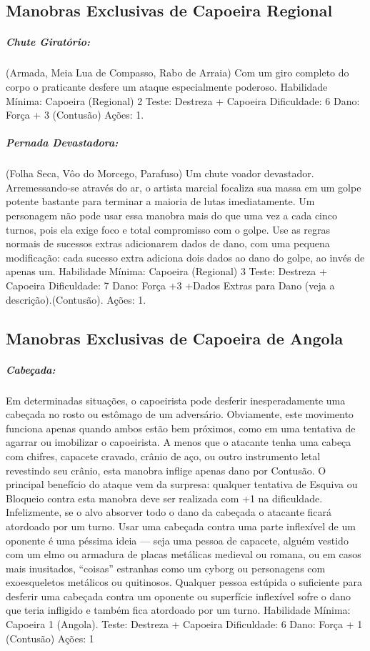 \subsection{Manobras Exclusivas de Capoeira Regional}

\subparagraph{\bf Chute Giratório:}
(Armada, Meia Lua de Compasso, Rabo de Arraia) Com um giro completo do corpo o praticante desfere um ataque especialmente poderoso. 
	Habilidade Mínima: Capoeira (Regional) 2
    Teste: Destreza + Capoeira
    Dificuldade: 6
    Dano: Força + 3 (Contusão)
    Ações: 1.

\subparagraph{\bf Pernada Devastadora:}
(Folha Seca, Vôo do Morcego, Parafuso) Um chute voador devastador. Arremessando-se através do ar, o artista marcial focaliza sua massa em um golpe potente bastante para terminar a maioria de lutas imediatamente. Um personagem não pode usar essa manobra mais do que uma vez a cada cinco turnos, pois ela exige foco e total compromisso com o golpe. Use as regras normais de sucessos extras adicionarem dados de dano, com uma pequena modificação: cada sucesso extra adiciona dois dados ao dano do golpe, ao invés de apenas um.
	Habilidade Mínima: Capoeira (Regional) 3
    Teste: Destreza + Capoeira
    Dificuldade: 7
    Dano: Força +3 +Dados Extras para Dano (veja a descrição).(Contusão).
    Ações: 1.

\subsection{Manobras Exclusivas de Capoeira de Angola}

\subparagraph{\bf Cabeçada:}
Em determinadas situações, o capoeirista pode desferir inesperadamente uma cabeçada no rosto ou estômago de um adversário. Obviamente, este movimento funciona apenas quando ambos estão bem próximos, como em uma tentativa de agarrar ou imobilizar o capoeirista. A menos que o atacante tenha uma cabeça com chifres, capacete cravado, crânio de aço, ou outro instrumento letal revestindo seu crânio, esta manobra inflige apenas dano por Contusão. O principal benefício do ataque vem da surpresa: qualquer tentativa de Esquiva ou Bloqueio contra esta manobra deve ser realizada com +1 na dificuldade. Infelizmente, se o alvo absorver todo o dano da cabeçada o atacante ficará atordoado por um turno. Usar uma cabeçada contra uma parte inflexível de um oponente é uma péssima ideia — seja uma pessoa de capacete, alguém vestido com um elmo ou armadura de placas metálicas medieval ou romana, ou em casos mais inusitados, “coisas” estranhas como um cyborg ou personagens com exoesqueletos metálicos ou quitinosos. Qualquer pessoa estúpida o suficiente para desferir uma cabeçada contra um oponente ou superfície inflexível sofre o dano que teria infligido e também fica atordoado por um turno. 
	Habilidade Mínima: Capoeira 1 (Angola). 
	Teste: Destreza + Capoeira
    Dificuldade: 6
    Dano: Força + 1 (Contusão)
    Ações: 1

